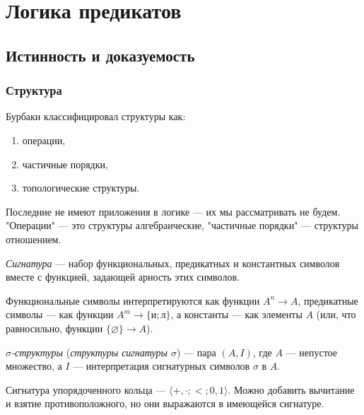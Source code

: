 \documentclass[a4paper,11pt]{article}
\begin{document}
\maketitle

\tableofcontents

\section{Логика предикатов}

\subsection{Истинность и доказуемость}

\subsubsection{Структура}

Бурбаки классифицировал структуры как:
\begin{enumerate}
	\item операции,
	\item частичные порядки,
	\item топологические структуры.
\end{enumerate}

Последние не имеют приложения в логике --- их мы рассматривать не будем. "Операции" --- это структуры алгебраические, "частичные порядки" --- структуры отношением.

\begin{definition}
	\emph{Сигнатура} --- набор функциональных, предикатных и константных символов вместе с функцией, задающей арность этих символов.

	Функциональные символы интерпретируются как функции $A^n \to A$, предикатные символы --- как функции $A^m \to \{\text{и}; \text{л}\}$, а константы --- как элементы $A$ (или, что равносильно, функции $\{\varnothing\} \to A$).

	\emph{$\sigma$-структуры} (\emph{структуры сигнатуры $\sigma$}) --- пара $(A, I)$, где $A$ --- непустое множество, а $I$ --- интерпретация сигнатурных символов $\sigma$ в $A$.
\end{definition}

\begin{exmpl}
	Сигнатура упорядоченного кольца --- $\langle {+}, {\cdot}; {<}; 0, 1 \rangle$. Можно добавить вычитание и взятие противоположного, но они выражаются в имеющейся сигнатуре.
\end{exmpl}
\end{document}

